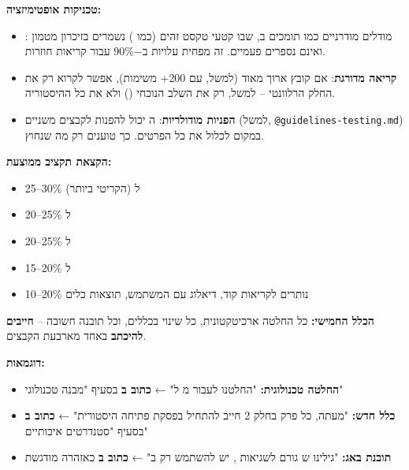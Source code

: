 \textbf{טכניקות אופטימיזציה:}
\begin{itemize}
  \item \textbf{}: מודלים מודרניים כמו  תומכים ב, שבו קטעי טקסט זהים (כמו ) נשמרים בזיכרון מטמון ואינם נספרים פעמיים. זה מפחית עלויות ב\num{-90}\% עבור קריאות חוזרות.
  \item \textbf{קריאה מדורגת}: אם קובץ ארוך מאוד (למשל,  עם \num{200}+ משימות), אפשר לקרוא רק את החלק הרלוונטי – למשל, רק את השלב הנוכחי () ולא את כל ההיסטוריה.
  \item \textbf{הפניות מודולריות}: ה יכול להפנות לקבצים משניים (למשל, \texttt{@guidelines-testing.md}) במקום לכלול את כל הפרטים. כך טוענים רק מה שנחוץ.
\end{itemize}

\textbf{הקצאת תקציב ממוצעת:}
\begin{itemize}
  \item \num{25}–\num{30}\% ל (הקריטי ביותר)
  \item \num{20}–\num{25}\% ל
  \item \num{20}–\num{25}\% ל
  \item \num{15}–\num{20}\% ל
  \item \num{10}–\num{20}\% נותרים לקריאות קוד, דיאלוג עם המשתמש, תוצאות כלים
\end{itemize}


\textbf{הכלל החמישי:} כל החלטה ארכיטקטונית, כל שינוי בכללים, וכל תובנה חשובה – \textbf{חייבים להיכתב} באחד מארבעת הקבצים.

\textbf{דוגמאות:}
\begin{itemize}
  \item \textbf{החלטה טכנולוגית:} "החלטנו לעבור מ ל" ← \textbf{כתוב ב} בסעיף "מבנה טכנולוגי"
  \item \textbf{כלל חדש:} "מעתה, כל פרק בחלק \num{2} חייב להתחיל בפסקת פתיחה היסטורית" ← \textbf{כתוב ב} בסעיף "סטנדרטים איכותיים"
  \item \textbf{תובנת באג:} "גילינו ש גורם לשגיאות , יש להשתמש רק ב" ← \textbf{כתוב ב} כאזהרה מודגשת
\end{itemize}

